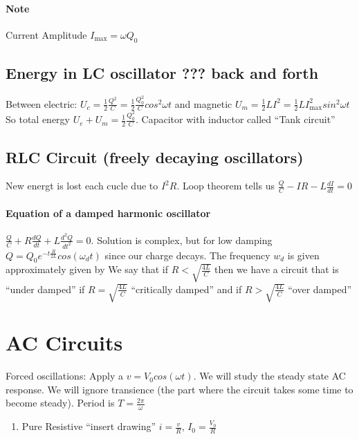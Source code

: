 \documentclass{article}
\begin{document}
    \paragraph{Note} Current Amplitude $I_{\text{max}} = \omega Q_0$
    \subsection{Energy in LC oscillator ??? back and forth}
    Between electric: $U_c = \frac{1}{2}\frac{Q^2}{C} = \frac{1}{2}\frac{Q_0^2}{C}cos^2\omega t$
     and magnetic $U_m = \frac{1}{2}LI^2 = \frac{1}{2}LI^2_\text{max}sin^2\omega t$
     So total energy $U_e + U_m = \frac{1}{2}\frac{Q^2_0}{C}$.
     Capacitor with inductor called ``Tank circuit''
     \subsection{RLC Circuit (freely decaying oscillators)}
     New energt is lost each cucle due to $I^2R$. Loop theorem tells us $\frac{Q}{C} -IR - L\frac{dI}{dt} = 0$
     \paragraph{Equation of a damped harmonic oscillator} $\frac{Q}{C} + R\frac{dQ}{dt} + L\frac{d^2Q}{dt^2} = 0$.
     Solution is complex, but for low damping $Q = Q_0e^{-t\frac{R}{2L}}cos(\omega _d t)$ since our charge decays.
     The frequency $w_d$ is given approximately given by 
     We say that if $R < \sqrt{\frac{4L}{C}}$ then we have a circuit that is ``under damped''
     if $R = \sqrt{\frac{4L}{C}}$ ``critically damped''
     and if $R > \sqrt{\frac{4L}{C}}$ ``over damped''
     
     \section{AC Circuits}
     Forced oscillations: Apply a $v = V_0 cos(\omega t)$. We will study the steady state AC response.
     We will ignore transience (the part where the circuit takes some time to become steady).
     Period is $ T = \frac{2\pi}{\omega}$
     \begin{enumerate}
         \item Pure Resistive ``insert drawing''
         $i = \frac{v}{R}$, $I_0 = \frac{V_0}{R}$
     \end{enumerate}
\end{document}
